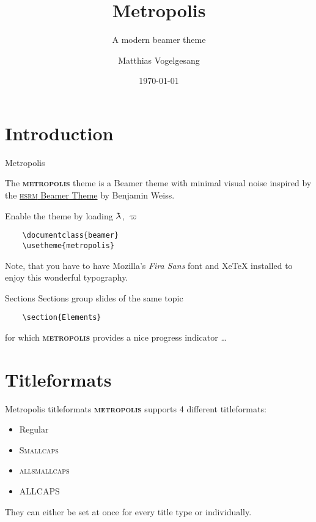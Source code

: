 \documentclass[10pt]{beamer}
\title{Metropolis}
\subtitle{A modern beamer theme}
\date{\today}
\author{Matthias Vogelgesang}
\institute{Center for modern beamer themes}
\newcommand{\lambdabar}{{\mkern 0.0mu\lambda\mkern -10mu\mathchar '26\mkern 2mu}}
\newcommand{\themename}{\textbf{\textsc{metropolis}}\xspace}
\begin{document}
\maketitle


\section{Introduction}

\begin{frame}[fragile]{Metropolis}

    The \themename theme is a Beamer theme with minimal visual noise
    inspired by the \href{https://github.com/hsrmbeamertheme/hsrmbeamertheme}{\textsc{hsrm} Beamer
    Theme} by Benjamin Weiss.

    Enable the theme by loading $\lambdabar$, $\varpi$

    \begin{verbatim}    \documentclass{beamer}
    \usetheme{metropolis}\end{verbatim}

    Note, that you have to have Mozilla's \emph{Fira Sans} font and XeTeX
    installed to enjoy this wonderful typography.
\end{frame}

\begin{frame}[fragile]{Sections}
    Sections group slides of the same topic

    \begin{verbatim}    \section{Elements}\end{verbatim}

    for which \themename provides a nice progress indicator \ldots
\end{frame}

\section{Titleformats}

\begin{frame}[fragile]{Metropolis titleformats}
    \themename supports 4 different titleformats:
    \begin{itemize}
        \item Regular
        \item \textsc{Smallcaps}
        \item \textsc{allsmallcaps}
        \item ALLCAPS
    \end{itemize}
    They can either be set at once for every title type or individually.
\end{frame}
\end{document}
